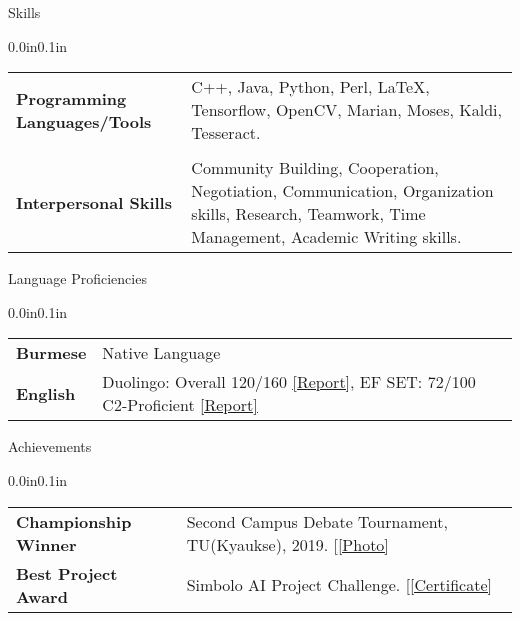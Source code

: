 \documentclass{resume} %
\makeatletter
\newcommand{\entry}[2]{#1 & #2 \tabularnewline} %
\newcommand{\tableEnv}[2]{%
  \begin{rSection}{#1} %
    \begin{adjustwidth}{0.0in}{0.1in} %
      \begin{tabularx}{\linewidth}{@{} >{\bfseries}l @{\hspace{6ex}} X @{}}
        #2 %
      \end{tabularx}
    \end{adjustwidth}
  \end{rSection}
}
\makeatother
\begin{document}

\tableEnv{Skills}{
    \entry{Programming Languages/Tools}{C++, Java, Python, Perl, \LaTeX, Tensorflow, OpenCV, Marian, Moses, Kaldi, Tesseract.} \\
    \entry{Interpersonal Skills}{Community Building, Cooperation, Negotiation, Communication, Organization skills, Research, Teamwork, Time Management, Academic Writing skills.}
    
}


\tableEnv{Language Proficiencies}{
    \entry{Burmese}{Native Language}
    \entry{English}{Duolingo: Overall 120/160 \href{https://certs.duolingo.com/dff22596847057dc88c4a579c28f19d4}{\underline{[Report]}}, EF SET: 72/100 C2-Proficient \href{https://www.efset.org/cert/jEKJVy}{\underline{[Report]}}}
}


\tableEnv{Achievements}{
    \entry{Championship Winner}{Second Campus Debate Tournament, TU(Kyaukse), 2019. [\href{https://imgur.com/gallery/tUJeTdM}{\underline{[Photo]}}}
    \entry{Best Project Award}{Simbolo AI Project Challenge. [\href{https://imgur.com/gallery/IsJdIhc}{\underline{[Certificate]}}}
}
\end{document}
